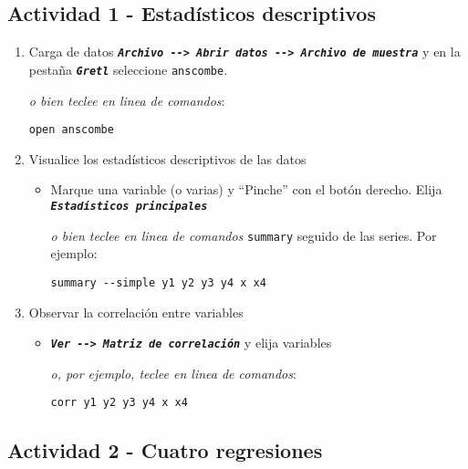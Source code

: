 \documentclass[11pt]{article}
\begin{document}
\subsection{Actividad 1 - Estadísticos descriptivos}
\label{sec:org6b87beb}

\begin{enumerate}
\item Carga de datos
\label{sec:org4f8bde7}
\textbf{\emph{\texttt{Archivo -{}-> Abrir datos -{}-> Archivo de muestra}}} y en la pestaña
\textbf{\emph{\texttt{Gretl}}} seleccione \texttt{anscombe}.

{\vspace{3pt} \color{gray!70!black}
\emph{o bien teclee en linea de comandos}:
\begin{verbatim}
open anscombe
\end{verbatim}
}

\item Visualice los estadísticos descriptivos de las datos
\label{sec:orgfa5bd91}

\begin{itemize}
\item Marque una variable (o varias) y ``Pinche'' con el botón derecho.
Elija \textbf{\emph{\texttt{Estadísticos principales}}}

{\vspace{3pt} \color{gray!70!black}
\emph{o bien teclee en linea de comandos} \texttt{summary} seguido de las series. Por ejemplo:
\begin{verbatim}
summary --simple y1 y2 y3 y4 x x4
\end{verbatim}
}
\end{itemize}

\item Observar la correlación entre variables
\label{sec:org1149a6f}

\begin{itemize}
\item \textbf{\emph{\texttt{Ver -{}-> Matriz de correlación}}} y elija variables

{\vspace{3pt} \color{gray!70!black}
\emph{o, por ejemplo, teclee en linea de comandos}:
\begin{verbatim}
corr y1 y2 y3 y4 x x4
\end{verbatim}
}
\end{itemize}
\end{enumerate}

\subsection{Actividad 2 - Cuatro regresiones}
\label{sec:orgd632461}
\end{document}
